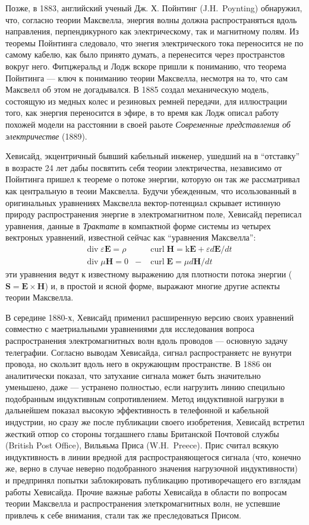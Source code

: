 \documentclass[12pt, oneside, a4paper]{article}
\begin{document}
Позже, в 1883, английский ученый Дж. Х. Пойнтинг (J.H.~Poynting) обнаружил, что, согласно теории Максвелла, энергия волны должна распространяться вдоль направления, перпендикурного как электрическому, так и магнитному полям. Из теоремы Пойнтинга следовало, что энегия электрического тока переносится не по самому кабелю, как было принято думать, а перенесится через пространстов вокруг него. Фитцжеральд и Лодж вскоре пришли к пониманию, что теорема Пойнтинга --- ключ к пониманию теории Максвелла, несмотря на то, что сам Максвелл об этом не догадывался. В 1885 создал механическую модель, состоящую из медных колес и резиновых ремней передачи, для иллюстрации того, как энергия переносится в эфире, в то время как Лодж описал работу похожей модели на расстоянии в своей раьоте \emph{Современные представления об электричестве} (1889).

Хевисайд, экцентричный бывший кабельный инженер, ушедший на в ``отставку'' в возрасте 24 лет дабы посвятить себя теории электричества, независимо от Пойнтинга пришел к теореме о потоке энергии, которую он так же рассматривал как центральную в теоии Максвелла. Будучи убежденным, что исользованный в оригинальных уравнениях Максвелла вектор-потенциал скрывает истинную природу распространения энергие в электромагнитном поле, Хевисайд переписал уравнения, данные в \emph{Трактате} в компактной форме системы из четырех вектроных уравнений, известной сейчас как ``уравнения Максвелла'':
\begin{align*}
&\operatorname{div}\varepsilon{}\mathbf{E} = \rho& 
&\operatorname{curl}\mathbf{H}=\mathrm{k}\mathbf{E} + \varepsilon{}d\mathbf{E}/dt\\
&\operatorname{div}\mu{}\mathbf{H}=0& 
-&\operatorname{curl}\mathbf{E}=\mu{}d\mathbf{H}/dt
\end{align*}
эти уравнения ведут к известному выражению для плотности потока энергии ($\mathbf{S}=\mathbf{E}\times\mathbf{H}$) и, в простой и ясной форме, выражают многие другие аспекты теории Максвелла.

В середине 1880-х, Хевисайд применил расширенную версию своих уравнений совместно с маетриальными уравнениями для исследования вопроса распространения электромагнитных волн вдоль проводов --- основную задачу телеграфии. Согласно выводам Хевисайда, сигнал распространяетс не вунутри провода, но скользит вдоль него в окружающнм пространстве. В 1886 он аналитически показал, что затухание сигнала может быть значительно уменьшено, даже --- устранено полностью, если нагрузить линию специльно подобранным индуктивным сопротивлением. Метод индуктивной нагрузки в дальнейшем показал высокую эффективность в телефонной и кабельной индустрии, но сразу же после публикации своего изобретения, Хевисайд встретил жесткий отпор со стороны тогдашнего главы Британской Почтовой службы (British Post Office), Вильяьма Приса (W.H.~Preece). Прис считал всякую индуктивность в линии вредной для распространяющегося сигнала (что, конечно же, верно в случае неверно подобранного значения нагрузочной индуктивности) и предпринял попытки заблокировать публикацию противоречащего его взглядам работы Хевисайда. Прочие важные работы Хевисайда в области по вопросам теории Максвелла и распространения элеткромагнитных волн, не успевшие привлечь к себе внимания, стали так же преследоваться Присом.
\end{document}
